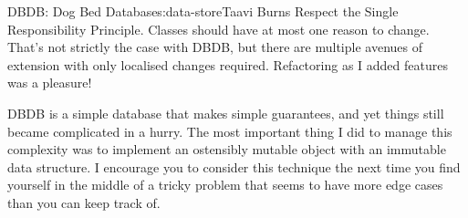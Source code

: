 \begin{aosachapter}{DBDB: Dog Bed Database}{s:data-store}{Taavi Burns}
Respect the Single Responsibility Principle. Classes should have at most
one reason to change. That's not strictly the case with DBDB, but there
are multiple avenues of extension with only localised changes required.
Refactoring as I added features was a pleasure!

\label{summary}

DBDB is a simple database that makes simple guarantees, and yet things
still became complicated in a hurry. The most important thing I did to
manage this complexity was to implement an ostensibly mutable object
with an immutable data structure. I encourage you to consider this
technique the next time you find yourself in the middle of a tricky
problem that seems to have more edge cases than you can keep track of.

\end{aosachapter}
